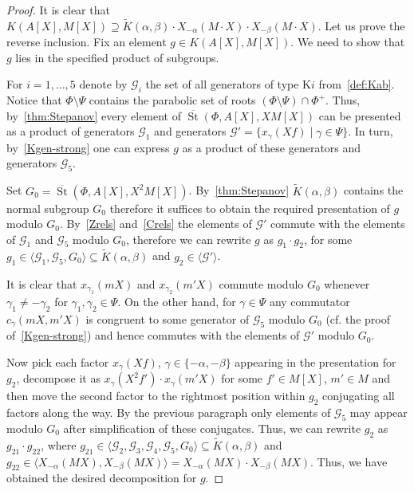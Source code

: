 \documentclass[oneside, 8pt]{amsart}
\theoremstyle{remark}
\theoremstyle{definition}
\numberwithin{lemma}{section}
\numberwithin{prop}{section}
\numberwithin{corollary}{section}
\numberwithin{externaltheorem}{section}
\DeclareMathOperator{\St}{St}
\numberwithin{equation}{section}
\begin{document}
\begin{proof}
It is clear that $K(A[X], M[X]) \supseteq \widetilde{K}(\alpha, \beta) \cdot X_{-\alpha}(M \cdot X) \cdot X_{-\beta}(M \cdot X)$. Let us prove the reverse inclusion. Fix an element $g\in K(A[X], M[X])$. We need to show that $g$ lies in the specified product of subgroups.

For $i=1,\ldots,5$ denote by $\mathcal{G}_i$ the set of all generators of type K$i$ from~\cref{def:Kab}.
Notice that $\Phi \setminus \Psi$ contains the parabolic set of roots $(\Phi \setminus \Psi)\cap \Phi^+$.
Thus, by~\cref{thm:Stepanov} every element of $\overline{\St}(\Phi, A[X], XM[X])$ can be presented as a product of generators $\mathcal{G}_1$ and generators $\mathcal{G}' = \{ x_{\gamma}(Xf) \mid \gamma \in \Psi\}$. In turn, by~\cref{Kgen-strong} one can express $g$ as a product of these generators and generators $\mathcal{G}_5$. 

Set $G_0 = \overline{\St}(\Phi, A[X], X^2M[X])$. By~\cref{thm:Stepanov} $\widetilde{K}(\alpha, \beta)$ contains the normal subgroup $G_0$ therefore it suffices to obtain the required presentation of $g$ modulo $G_0$. By~\cref{Zrels} and~\cref{Crels} the elements of $\mathcal{G}'$ commute with the elements of $\mathcal{G}_1$ and $\mathcal{G}_5$ modulo $G_0$, therefore we can rewrite $g$ as $g_1 \cdot g_2$, for some $g_1 \in \langle \mathcal{G}_1, \mathcal{G}_5, G_0 \rangle \subseteq \widetilde{K}(\alpha, \beta)$ and $g_2 \in \langle \mathcal{G}' \rangle$.

It is clear that  $x_{\gamma_1}(mX)$ and $x_{\gamma_2}(m'X)$ commute modulo $G_0$ whenever $\gamma_1 \neq - \gamma_2$ for $\gamma_1, \gamma_2 \in \Psi$. On the other hand, for $\gamma \in \Psi$ any commutator $c_{\gamma}(mX, m'X)$ is congruent to some generator of $\mathcal{G}_5$  modulo $G_0$ (cf. the proof of~\cref{Kgen-strong}) and hence commutes with the elements of $\mathcal{G}'$ modulo $G_0$. 

Now pick each factor $x_{\gamma}(Xf)$, $\gamma \in \{ -\alpha, -\beta \}$ appearing in the presentation for~$g_2$, decompose it as $x_{\gamma}(X^2f') \cdot x_{\gamma}(m'X)$ for some $f' \in M[X]$, $m' \in M$ and then move the second factor to the rightmost position within $g_2$ conjugating all factors along the way. By the previous paragraph only elements of  $\mathcal{G}_5$ may appear modulo $G_0$ after simplification of these conjugates.
Thus, we can rewrite $g_2$ as $g_{21} \cdot g_{22}$, where $g_{21} \in \langle \mathcal{G}_2, \mathcal{G}_3, \mathcal{G}_4, \mathcal{G}_5, G_0 \rangle \subseteq \widetilde{K}(\alpha, \beta)$ and $g_{22} \in \langle X_{-\alpha}(MX), X_{-\beta}(MX) \rangle = X_{-\alpha}(MX) \cdot X_{-\beta}(MX)$.
Thus, we have obtained the desired decomposition for $g$. \end{proof}
\end{document}
